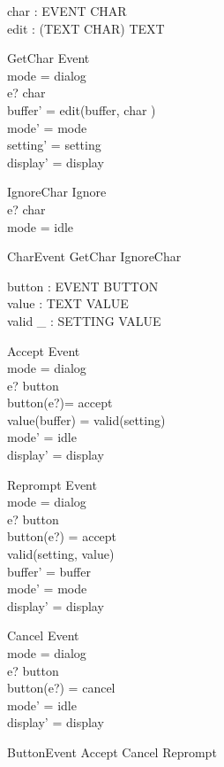\documentclass{llncs}
\begin{document}
\begin{axdef}
char : EVENT \pfun CHAR \\
edit : (TEXT \cross CHAR) \fun TEXT
\end{axdef}
\begin{schema}{GetChar}
Event \\
\ST mode = dialog \\
e? \in \dom char \\
buffer' = edit(buffer, char ) \\
mode' = mode \\
setting' = setting \\
display' = display
\end{schema}
\begin{schema}{IgnoreChar}
Ignore \\
\ST e? \in \dom char \\
mode = idle
\end{schema}
\begin{zed}
CharEvent \sdef GetChar \lor IgnoreChar
\end{zed}

\begin{axdef}
button : EVENT \pfun BUTTON \\
value : TEXT \fun VALUE \\
valid \_ : SETTING \rel VALUE
\end{axdef}
\begin{schema}{Accept}
Event \\
\ST mode = dialog \\
e? \in \dom button \\
button(e?)= accept \\
value(buffer) = valid(setting)\\
mode' = idle \\
display' = display
\end{schema}
\begin{schema}{Reprompt}
Event \\
\ST mode = dialog \\
e? \in \dom button \\
button(e?) = accept \\
\lnot valid(setting, value)\\
buffer' = buffer \\
mode' = mode \\
display' = display
\end{schema}
\begin{schema}{Cancel}
Event \\
\ST mode = dialog \\
e? \in \dom button \\
button(e?) = cancel \\
mode' = idle \\
display' = display
\end{schema}
\begin{zed}
ButtonEvent \sdef Accept \lor Cancel \lor Reprompt
\end{zed}
\end{document}
